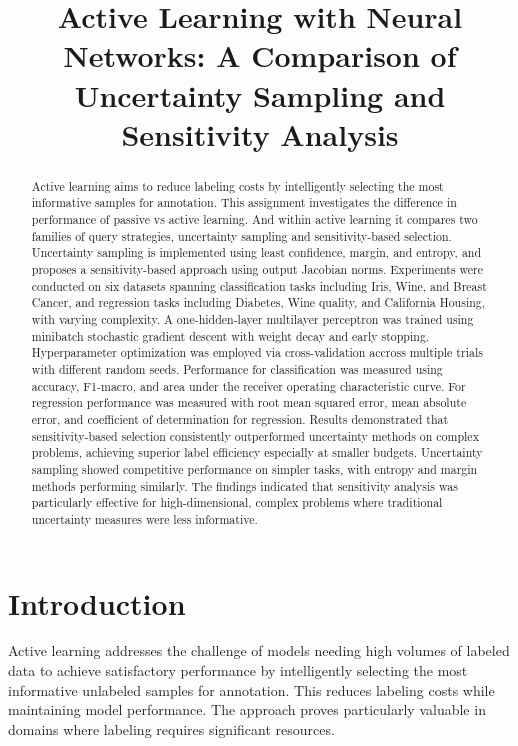 \documentclass[conference]{IEEEtran}
\title{Active Learning with Neural Networks: A Comparison of Uncertainty Sampling and Sensitivity Analysis}
\author{\IEEEauthorblockN{\nameinit\ \surname\ \, (\studentnumber)}
\IEEEauthorblockA{Stellenbosch University\\ Machine Learning 441\\ \emailaddr \\\github}}
\begin{document}
\maketitle

\begin{abstract}
Active learning aims to reduce labeling costs by intelligently selecting the most informative samples for annotation. This assignment investigates the difference in performance of passive vs active learning. And within active learning it compares two families of query strategies, uncertainty sampling and sensitivity-based selection. Uncertainty sampling is implemented using least confidence, margin, and entropy, and proposes a sensitivity-based approach using output Jacobian norms. Experiments were conducted on six datasets spanning classification tasks including Iris, Wine, and Breast Cancer, and regression tasks including Diabetes, Wine quality, and California Housing, with varying complexity. A one-hidden-layer multilayer perceptron was trained using minibatch stochastic gradient descent with weight decay and early stopping. Hyperparameter optimization was employed via cross-validation accross multiple trials with different random seeds. Performance for classification was measured using accuracy, F1-macro, and area under the receiver operating characteristic curve. For regression performance was measured with root mean squared error, mean absolute error, and coefficient of determination for regression. Results demonstrated that sensitivity-based selection consistently outperformed uncertainty methods on complex problems, achieving superior label efficiency especially at smaller budgets. Uncertainty sampling showed competitive performance on simpler tasks, with entropy and margin methods performing similarly. The findings indicated that sensitivity analysis was particularly effective for high-dimensional, complex problems where traditional uncertainty measures were less informative.
\end{abstract}

\section{Introduction}

Active learning addresses the challenge of models needing high volumes of labeled data to achieve satisfactory performance by intelligently selecting the most informative unlabeled samples for annotation. This reduces labeling costs while maintaining model performance. The approach proves particularly valuable in domains where labeling requires significant resources.
\end{document}

